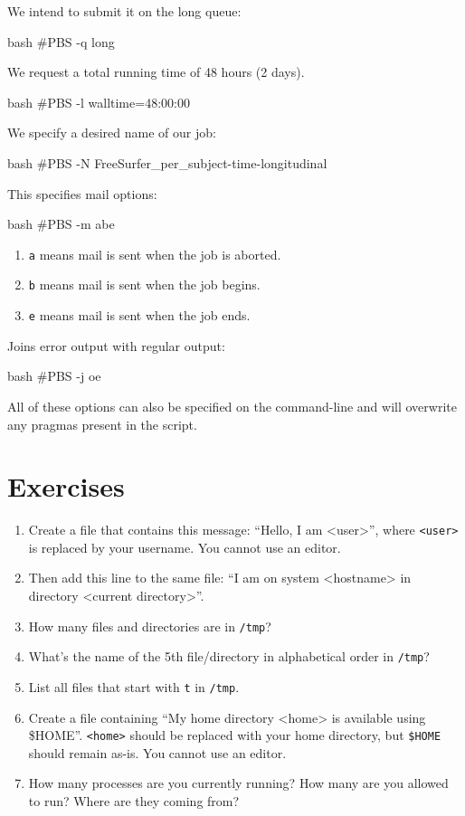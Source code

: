 We intend to submit it on the long queue:

\begin{code}{bash}
  #PBS -q long
\end{code}

We request a total running time of 48 hours (2 days).

\begin{code}{bash}
  #PBS -l walltime=48:00:00
\end{code}

We specify a desired name of our job:

\begin{code}{bash}
  #PBS -N FreeSurfer_per_subject-time-longitudinal
\end{code}

This specifies mail options:

\begin{code}{bash}
  #PBS -m abe
\end{code}

\begin{enumerate}
\item \verb|a| means mail is sent when the job is aborted.
\item \verb|b| means mail is sent when the job begins.
\item \verb|e| means mail is sent when the job ends.
\end{enumerate}

Joins error output with regular output:

\begin{code}{bash}
  #PBS -j oe
\end{code}

All of these options can also be specified on the command-line and will
overwrite any pragmas present in the script.

\section{Exercises}

\begin{enumerate}
    \item Create a file that contains this message: ``Hello, I am <user>'',
        where \verb|<user>| is replaced by your username. You cannot use an editor.
    \item Then add this line to the same file: ``I am on system <hostname> in
        directory <current directory>''.
    \item How many files and directories are in \verb|/tmp|?
    \item What's the name of the 5th file/directory in alphabetical order in \verb|/tmp|?
    \item List all files that start with \verb|t| in \verb|/tmp|.
    \item Create a file containing ``My home directory <home> is available using \$HOME''.
        \verb|<home>| should be replaced with your home directory, but \verb|$HOME|
        should remain as-is. You cannot use an editor.
    \item How many processes are you currently running? How many are you allowed
        to run? Where are they coming from?
\end{enumerate}

